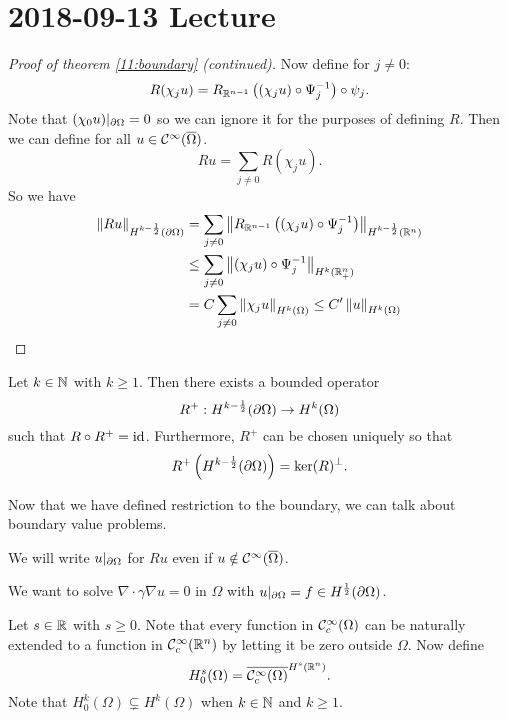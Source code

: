 \section{2018-09-13 Lecture}

\begin{proof}[Proof of theorem \ref{11:boundary} (continued)]
  Now define for $j\neq0$:
  \[ R(\chi_ju) = R_{\mathbb{R}^{n-1}} \left( (\chi_ju) \circ \Psi_j ^{-1} \right) \circ \psi_j. \]
  Note that $(\chi_0u)|_{\partial\Omega}=0$ so we can ignore it for the purposes of defining $R$.
  Then we can define for all $u\in\mathcal{C}^\infty(\overline\Omega)$.
  \[ Ru = \sum_{j\neq0} R(\chi_ju). \]
  So we have
  \begin{align*}
    \left\lVert Ru \right\rVert_{H^{k-\frac12}(\partial\Omega)} &= \sum_{j\neq0} \left\lVert  R_{\mathbb{R}^{n-1}} \left( (\chi_ju)\circ\Psi_j^{-1} \right)  \right\rVert_{H^{k-\frac12}(\mathbb{R}^n)} \\
    &\leq \sum_{j\neq0} \left\lVert  (\chi_ju)\circ\Psi_j^{-1}  \right\rVert_{H^k(\mathbb{R}_+^n)} \\
    &= C\sum_{j\neq0} \left\lVert \chi_ju \right\rVert_{H^k(\Omega)} \leq C'\left\lVert u \right\rVert_{H^k(\Omega)} \qedhere
  \end{align*}
\end{proof}

\begin{exer}
  Let $k\in\mathbb{N}$ with $k\geq1$.
  Then there exists a bounded operator
  \[ R^+: H^{k-\frac12}(\partial\Omega) \to H^k(\Omega) \]
  such that $R\circ R^+=\operatorname{id}$.
  Furthermore, $R^+$ can be chosen uniquely so that
  \[ R^+\left( H^{k-\frac12}(\partial\Omega) \right) = \ker(R)^\perp. \]
\end{exer}

Now that we have defined restriction to the boundary, we can talk about boundary value problems.

\begin{rmk}
  We will write $u|_{\partial\Omega}$ for $Ru$ even if $u\notin\mathcal{C}^\infty(\overline\Omega)$.
\end{rmk}

We want to solve $\nabla\cdot\gamma\nabla u=0$ in $\Omega$ with $u|_{\partial\Omega}=f\in H^\frac12(\partial\Omega)$.

\begin{defn}
  Let $s\in\mathbb{R}$ with $s\geq0$.
  Note that every function in $\mathcal{C}_c^\infty(\Omega)$ can be naturally extended to a function in $\mathcal{C}_c^\infty(\mathbb{R}^n)$ by letting it be zero outside $\Omega$.
  Now define
  \[ H_0^s(\Omega) = \overline{\mathcal{C}_c^\infty(\Omega)}^{H^s(\mathbb{R}^n)}. \]
  Note that $H_0^k(\Omega) \subsetneq H^k(\Omega)$ when $k\in\mathbb{N}$ and $k\geq1$.
\end{defn}

